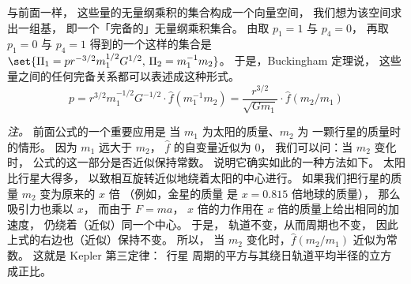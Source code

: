 与前面一样，
这些量的无量纲乘积的集合构成一个向量空间，
我们想为该空间求出一组基，
即一个「完备的」无量纲乘积集合。
由取 $p_1=1$ 与 $p_4=0$，
再取 $p_1=0$ 与 $p_4=1$ 得到的一个这样的集合是
$\set{\Pi_1=pr^{-3/2}m_1^{1/2}G^{1/2},\,\Pi_2=m_1^{-1}m_2}$。
于是，Buckingham 定理说，
这些量之间的任何完备关系都可以表述成这种形式。
\begin{equation*}
  p = r^{3/2}m_1^{-1/2}G^{-1/2}\cdot\hat{f}(m_1^{-1}m_2)  
    = \frac{r^{3/2}}{\sqrt{Gm_1}}\cdot\hat{f}(m_2/m_1)
\end{equation*}

\textit{注。}
前面公式的一个重要应用是
当 $m_1$ 为太阳的质量、$m_2$ 为  
一颗行星的质量时的情形。
因为 $m_1$ 远大于 $m_2$，
$\hat{f}$ 的自变量近似为 $0$，
我们可以问：当 $m_2$ 变化时，
公式的这一部分是否近似保持常数。
说明它确实如此的一种方法如下。
太阳比行星大得多，
以致相互旋转近似地绕着太阳的中心进行。
如果我们把行星的质量 $m_2$ 变为原来的 $x$ 倍 
（例如，金星的质量
是 $x=0.815$ 倍地球的质量），
那么吸引力也乘以 $x$，
而由于 $F=ma$，
$x$ 倍的力作用在 $x$ 倍的质量上给出相同的加速度，
仍绕着（近似）同一个中心。
于是，
轨道不变，从而周期也不变，
因此上式的右边也（近似）保持不变。
所以，
当 $m_2$ 变化时，$\hat{f}(m_2/m_1)$ 近似为常数。
这就是 Kepler 第三定律：~行星
周期的平方与其绕日轨道平均半径的立方
成正比。

